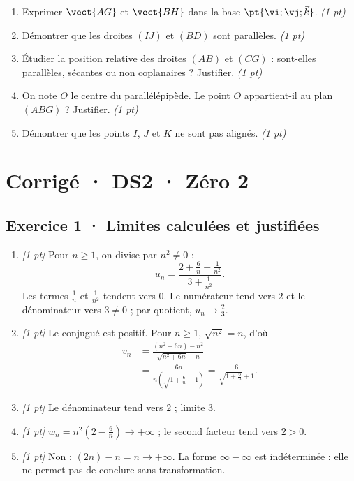 \begin{enumerate}

\item Exprimer $\vect{AG}$ et $\vect{BH}$ dans la base $\pt{\vi;\vj;\vec k}$. \hfill\textit{(1 pt)}

\item Démontrer que les droites $(IJ)$ et $(BD)$ sont parallèles. \hfill\textit{(1 pt)}

\item Étudier la position relative des droites $(AB)$ et $(CG)$ : sont-elles parallèles, sécantes ou non coplanaires ? Justifier. \hfill\textit{(1 pt)}

\item On note $O$ le centre du parallélépipède. Le point $O$ appartient-il au plan $(ABG)$ ? Justifier. \hfill\textit{(1 pt)}

\item Démontrer que les points $I$, $J$ et $K$ ne sont pas alignés. \hfill\textit{(1 pt)}

\end{enumerate}

\ifmxteacher\mxnewpage

\section*{Corrigé · DS2 · Zéro 2}\label{cor:2-2}

\subsection*{Exercice 1 · Limites calculées et justifiées}\begin{enumerate}

\item \textit{[1 pt]} Pour $n\ge1$, on divise par $n^2\ne0$ :
\[u_n=\frac{2+\frac{6}{n}-\frac{1}{n^2}}{3+\frac{1}{n^2}}.\]
Les termes $\frac{1}{n}$ et $\frac{1}{n^2}$ tendent vers $0$. Le numérateur tend vers $2$ et le dénominateur vers $3\ne0$ ; par quotient, $u_n\to\frac{2}{3}$.

\item \textit{[1 pt]} Le conjugué est positif. Pour $n\ge1$, $\sqrt{n^2}=n$, d'où
\[\begin{aligned}v_n&=\frac{(n^2+6n)-n^2}{\sqrt{n^2+6n}+n}\\&=\frac{6n}{n(\sqrt{1+\frac{6}{n}}+1)}=\frac{6}{\sqrt{1+\frac{6}{n}}+1}.\end{aligned}\]

\item \textit{[1 pt]} Le dénominateur tend vers $2$ ; limite $3$.

\item \textit{[1 pt]} $w_n=n^2(2-\frac{6}{n})\to+\infty$ ; le second facteur tend vers $2>0$.

\item \textit{[1 pt]} Non : $(2n)-n=n\to+\infty$. La forme $\infty-\infty$ est indéterminée : elle ne permet pas de conclure sans transformation.

\end{enumerate}


